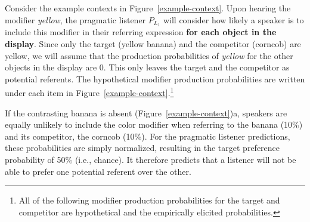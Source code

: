 \documentclass[10pt,letterpaper]{article}
\newcommand{\ek}[1]{\textcolor{Orange}{[ek: #1]}}
\newcommand{\jd}[1]{\textcolor{Purple}{[jd: #1]}}
\begin{document}
Consider the example contexts in Figure~\ref{example-context}. Upon hearing the modifier \textit{yellow}, the pragmatic listener $P_{L_1}$ will consider how likely a speaker is to include this modifier in their referring expression \textbf{for each object in the display}. Since only the target (yellow banana) and the competitor (corncob) are yellow, we will assume that the production probabilities of \textit{yellow} for the other objects in the display are 0. This only leaves the target and the competitor as potential referents. The hypothetical modifier production probabilities are written under each item in Figure~\ref{example-context}.\footnote{All of the following modifier production probabilities for the target and competitor are hypothetical and the empirically elicited probabilities.}

If the contrasting banana is absent (Figure~\ref{example-context})a, speakers are equally unlikely to include the color modifier when referring to the banana (10\%) and its competitor, the corncob (10\%). For the pragmatic listener predictions, these probabilities are simply normalized, resulting in the target preference probability of 50\% (i.e., chance). It therefore predicts that a listener will not be able to prefer one potential referent over the other.

\end{document}
